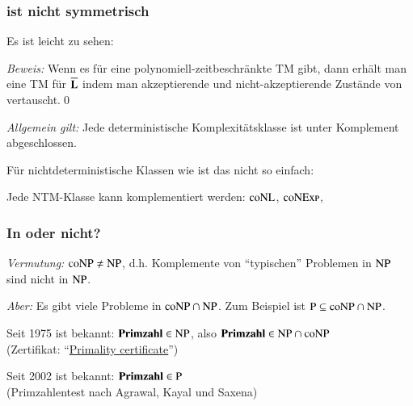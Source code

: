 \documentclass[aspectratio=1610,onlymath]{beamer}
\begin{document}
\begin{frame}\frametitle{ ist nicht symmetrisch}

Es ist leicht zu sehen:


\emph{Beweis:} Wenn es für  eine polynomiell-zeitbeschränkte TM 
gibt, dann erhält man eine TM für $\overline{\textbf{\textcolor{black}{L}}}$ indem man akzeptierende
und nicht-akzeptierende Zustände von  vertauscht.\qed\medskip

\emph{Allgemein gilt:} Jede deterministische Komplexitätsklasse ist unter Komplement abgeschlossen.

\bigskip\pause

Für nichtdeterministische Klassen wie  ist das nicht so einfach:

\medskip\pause


Jede NTM-Klasse kann komplementiert werden: ${\textsc{coNL}}$, ${\textsc{coNExp}}$, \ghost{\ldots}

\end{frame}

\begin{frame}\frametitle{In  oder nicht?}

\emph{Vermutung:} ${\textsc{coNP}}\neq{\textsc{NP}}$, d.h. Komplemente von
"`typischen"' Problemen in ${\textsc{NP}}$ sind nicht in ${\textsc{NP}}$.
\bigskip

\emph{Aber:} Es gibt viele Probleme in ${\textsc{coNP}}\cap{\textsc{NP}}$. Zum Beispiel
ist ${\textsc{P}}\subseteq{\textsc{coNP}}\cap{\textsc{NP}}$.
\bigskip\pause

\pause

Seit 1975 ist bekannt: $\textbf{\textcolor{black}{Primzahl}}\in{\textsc{NP}}$, also
$\textbf{\textcolor{black}{Primzahl}}\in{\textsc{NP}}\cap{\textsc{coNP}}$\\
(Zertifikat: "`\href{https://en.wikipedia.org/wiki/Primality_certificate}{Primality certificate}"')
\bigskip\pause

Seit 2002 ist bekannt: $\textbf{\textcolor{black}{Primzahl}}\in{\textsc{P}}$\\
(Primzahlentest nach Agrawal, Kayal und Saxena)


\end{frame}
\end{document}
